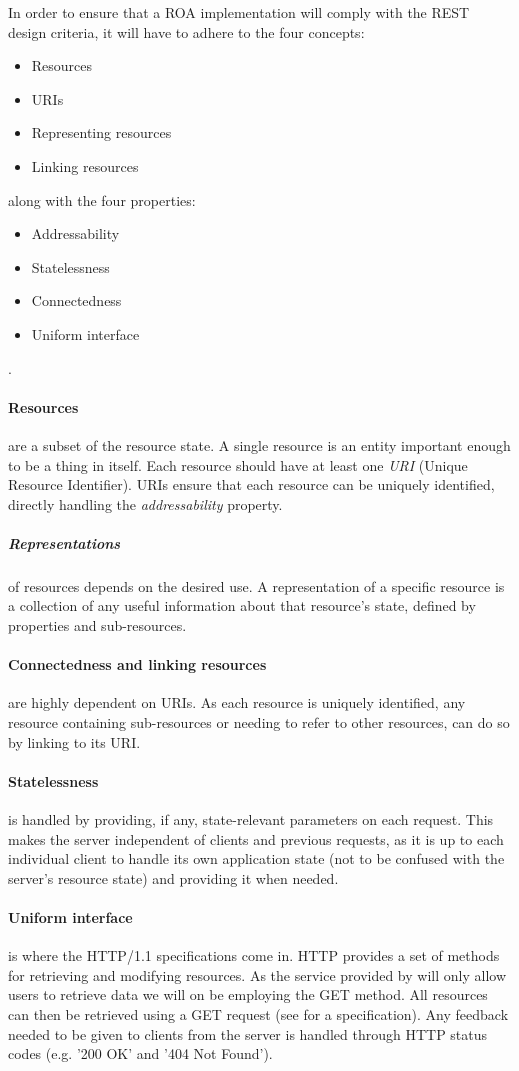 In order to ensure that a ROA implementation will comply with the REST design criteria, it will have to adhere to the four concepts\cite[Chapter 4]{restful_web_services}:
\begin{itemize}
\item Resources
\item URIs
\item Representing resources
\item Linking resources
\end{itemize}
along with the four properties:
\begin{itemize}
\item Addressability
\item Statelessness
\item Connectedness
\item Uniform interface
\end{itemize}.

\paragraph{Resources} are a subset of the resource state.
A single resource is an entity important enough to be a thing in itself.
Each resource should have at least one \textit{URI} (Unique Resource Identifier).
URIs ensure that each resource can be uniquely identified, directly handling the \textit{addressability} property.

\subparagraph{Representations} of resources depends on the desired use.
A representation of a specific resource is a collection of any useful information about that resource's state, defined by properties and sub-resources.

\paragraph{Connectedness and linking resources} are highly dependent on URIs.
As each resource is uniquely identified, any resource containing sub-resources or needing to refer to other resources, can do so by linking to its URI.

\paragraph{Statelessness} is handled by providing, if any, state-relevant parameters on each request.
This makes the server independent of clients and previous requests, as it is up to each individual client to handle its own application state (not to be confused with the server's resource state) and providing it when needed.

\paragraph{Uniform interface} is where the HTTP/1.1 specifications come in.
HTTP provides a set of methods for retrieving and modifying resources.
As the service provided by \projectname{} will only allow users to retrieve data we will on be employing the GET method.
All resources can then be retrieved using a GET request (see  for a specification).
Any feedback needed to be given to clients from the server is handled through HTTP status codes (e.g. '200 OK' and '404 Not Found').
